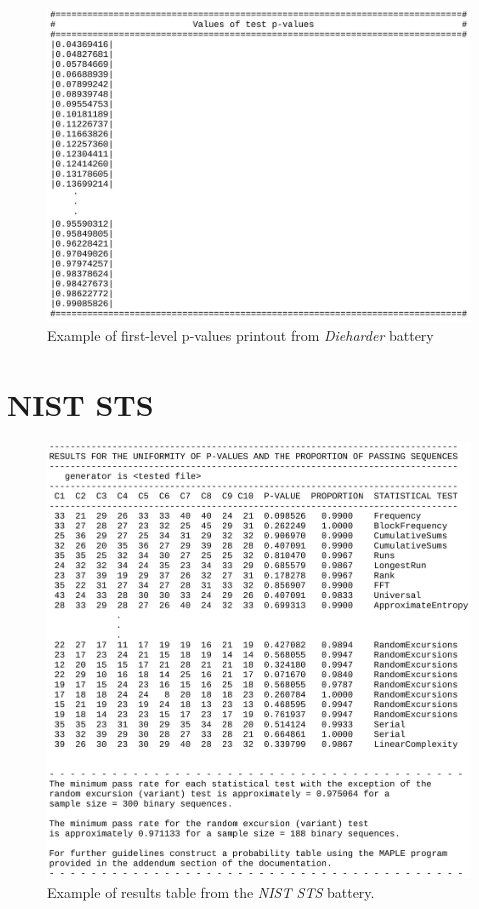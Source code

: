 \documentclass[
  digital,     %
  oneside,     %
  nosansbold,  %
  nocolorbold, %
  nolof,         %
  nolot,         %
]{fithesis4}
\begin{document}
\begin{figure}[h]
  \begin{center}
    \includegraphics[width=12.5cm]{figures/outputs-appendix/pvals.jpg}
  \end{center}
  \caption{Example of first-level p-values printout from \emph{Dieharder} battery}
  \label{fig:die_pvals}
\end{figure}

\newpage

\section{NIST STS} \label{append:nist-output}

\begin{figure}[h]
  \begin{center}
    \includegraphics[width=12.5cm]{figures/outputs-appendix/finalAnalysisReport.jpg}
  \end{center}
  \caption{Example of results table from the \emph{NIST STS} battery.}
  \label{fig:nist_tab}
\end{figure}
\end{document}
